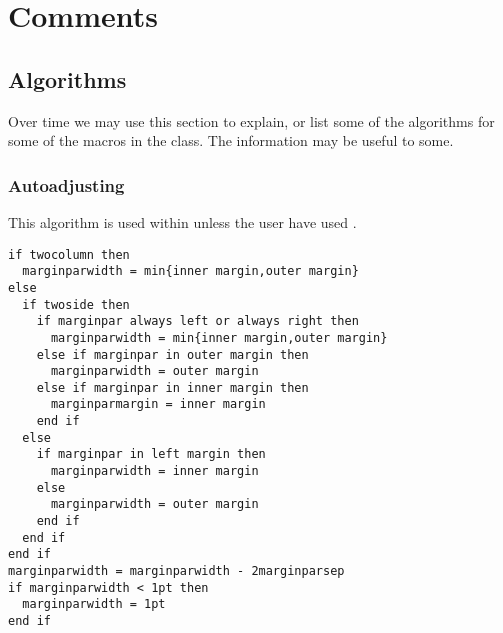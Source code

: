 \chapter{Comments}
\label{cha:comments}

\section{Algorithms}
\label{sec:algorithms}

Over time we may use this section to explain, or list some of the
algorithms for some of the macros in the class. The information may be
useful to some.

\subsection{Autoadjusting
  \texorpdfstring{}{\textbackslash marginparwidth}}
\label{sec:auto-csmarg}

This algorithm is used within \cmd{\fixthelayout} unless the user have
used \cmd{\setmarginnotes}.

\noindent
\begin{framed}
  \baselineskip
  \begin{small}
\begin{verbatim}
if twocolumn then
  marginparwidth = min{inner margin,outer margin}
else
  if twoside then
    if marginpar always left or always right then
      marginparwidth = min{inner margin,outer margin}
    else if marginpar in outer margin then
      marginparwidth = outer margin
    else if marginpar in inner margin then
      marginparmargin = inner margin
    end if
  else
    if marginpar in left margin then
      marginparwidth = inner margin
    else
      marginparwidth = outer margin
    end if
  end if
end if
marginparwidth = marginparwidth - 2marginparsep
if marginparwidth < 1pt then
  marginparwidth = 1pt
end if
\end{verbatim}
  \end{small}
\end{framed}



